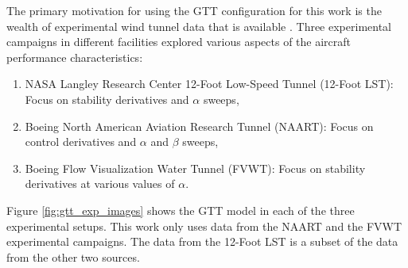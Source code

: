 The primary motivation for using the GTT configuration for this work is the wealth of experimental wind tunnel data that is available \cite{cunningham_generic_2018,cunningham_preliminary_2018}. 
Three experimental campaigns in different facilities explored various aspects of the aircraft performance characteristics:
\begin{enumerate}
    \item NASA Langley Research Center 12-Foot Low-Speed Tunnel (12-Foot LST): Focus on stability derivatives and $\alpha$ sweeps,
    \item Boeing North American Aviation Research Tunnel (NAART): Focus on control derivatives and $\alpha$ and $\beta$ sweeps,
    \item Boeing Flow Visualization Water Tunnel (FVWT): Focus on stability derivatives at various values of $\alpha$.
\end{enumerate}
Figure \ref{fig:gtt_exp_images} shows the GTT model in each of the three experimental setups.
This work only uses data from the NAART and the FVWT experimental campaigns.
The data from the 12-Foot LST is a subset of the data from the other two sources.  

